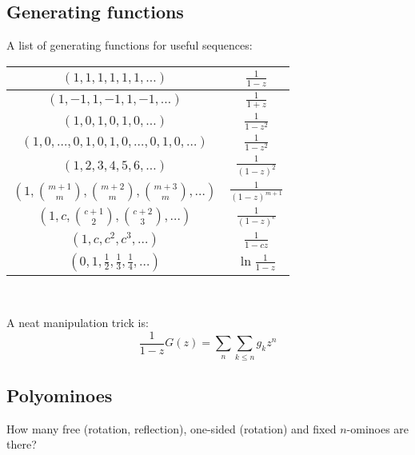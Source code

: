 \subsection{Generating functions}
  A list of generating functions for useful sequences:

  \begin{tabular}{|c|c|}
    \hline
    $(1,1,1,1,1,1,\ldots)$ & $\frac{1}{1-z}$ \\ \hline
    $(1,-1,1,-1,1,-1,\ldots)$ & $\frac{1}{1+z}$ \\ \hline
    $(1,0,1,0,1,0,\ldots)$ & $\frac{1}{1-z^2}$ \\ \hline
    $(1,0,\ldots,0,1,0,1,0,\ldots,0,1,0,\ldots)$ & $\frac{1}{1-z^2}$ \\ \hline
    $(1,2,3,4,5,6,\ldots)$ & $\frac{1}{(1-z)^2}$ \\ \hline
    $(1,\binom{m+1}{m},\binom{m+2}{m},\binom{m+3}{m},\ldots)$ & $\frac{1}{(1-z)^{m+1}}$ \\ \hline
    $(1,c,\binom{c+1}{2},\binom{c+2}{3},\ldots)$ & $\frac{1}{(1-z)^c}$ \\ \hline
    $(1,c,c^2, c^3, \ldots)$ & $\frac{1}{1-cz}$ \\ \hline
    $(0,1,\frac{1}{2},\frac{1}{3},\frac{1}{4},\ldots)$ & $\ln \frac{1}{1-z}$ \\ \hline
  \end{tabular}

\

A neat manipulation trick is:
\begin{equation*}
  \frac{1}{1-z}G(z) = \sum_{n}\sum_{k\leq n}g_kz^n
\end{equation*}

\subsection{Polyominoes} How many free (rotation, reflection), one-sided (rotation) and fixed $n$-ominoes are there?
      
